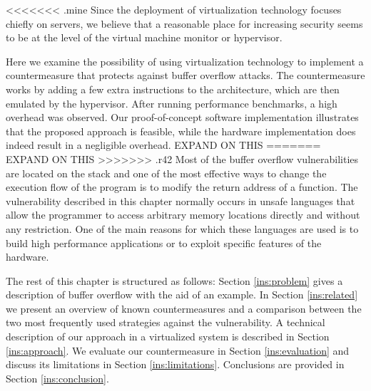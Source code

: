 <<<<<<< .mine
Since the deployment of virtualization technology focuses chiefly on servers, we believe that a reasonable place for increasing security seems to be at the level of the virtual machine monitor or hypervisor.

Here we examine the possibility of using virtualization technology to implement a countermeasure that protects against buffer overflow attacks. 
The countermeasure works by adding a few extra instructions to the architecture, which are then emulated by the hypervisor. 
After running performance benchmarks, a high overhead was observed. Our proof-of-concept software implementation illustrates that the proposed approach is feasible, while the hardware implementation does indeed result in a negligible overhead. EXPAND ON THIS
=======
EXPAND ON THIS
>>>>>>> .r42
Most of the buffer overflow vulnerabilities are located on the stack \cite{Xu02architecturesupport} and one of the most effective ways to change the execution flow of the program is to modify the return address of a function. The vulnerability described in this chapter normally occurs in unsafe languages that allow the programmer to access arbitrary memory locations directly and without any restriction. One of the main reasons for which these languages are used is to build high performance applications or to exploit specific features of the hardware. 

The rest of this chapter is structured as follows: Section \ref{ins:problem} gives a description of buffer overflow with the aid of an example. In Section \ref{ins:related} we present an overview of known countermeasures and a comparison between the two most frequently used strategies against the vulnerability. A technical description of our approach in a virtualized system is described in Section \ref{ins:approach}.
We evaluate our countermeasure in Section \ref{ins:evaluation} and discuss its limitations in Section \ref{ins:limitations}. Conclusions are provided in Section \ref{ins:conclusion}.

